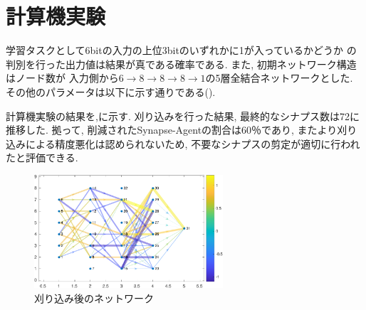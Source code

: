 \documentclass[a4paper,9pt,twocolumn]{jsarticle}
\begin{document}
\section{計算機実験}
学習タスクとして6bitの入力の上位3bitのいずれかに1が入っているかどうか
の判別を行った出力値は結果が真である確率である. 
また, 初期ネットワーク構造はノード数が
入力側から$6\rightarrow 8\rightarrow 8\rightarrow 8\rightarrow 1$の5層全結合ネットワークとした.
その他のパラメータは以下に示す通りである().
\vspace{-0.5cm}
\begin{table}[H]
  \caption{パラメータ一覧}
  \label{tab:param}
  \centering
 \end{table}
計算機実験の結果を,に示す.
刈り込みを行った結果, 最終的なシナプス数は72に推移した.
拠って, 削減されたSynapse-Agentの割合は60％であり, 
またより刈り込みによる精度悪化は認められないため, 
不要なシナプスの剪定が適切に行われたと評価できる.
\begin{figure}[H]
  \centering
  \includegraphics[width=7cm]{Graph-crop.pdf} 
  \caption{刈り込み後のネットワーク}
  \label{fig:Graph}
\end{figure}
\end{document}
